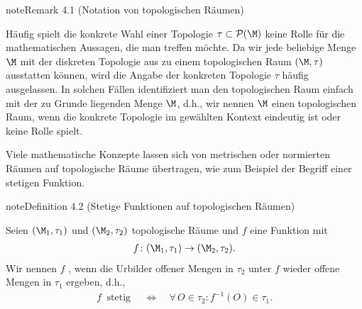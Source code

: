 \documentclass[letterpaper,10pt,english]{jupyterBook}
\begin{document}
\label{manifolds/manifolds_prelim:remark-2}
\begin{sphinxadmonition}{note}{Remark 4.1 (Notation von topologischen Räumen)}



\sphinxAtStartPar
Häufig spielt die konkrete Wahl einer Topologie \(\tau \subset \mathcal{P}(\M)\) keine Rolle für die mathematischen Aussagen, die man treffen möchte.
Da wir jede beliebige Menge \(\M\) mit der diskreten Topologie aus {\hyperref[\detokenize{manifolds/manifolds_prelim:ex:diskreteTopologie}]{}} zu einem topologischen Raum \((\M, \tau)\) ausstatten können, wird die Angabe der konkreten Topologie \(\tau\) häufig ausgelassen.
In solchen Fällen identifiziert man den topologischen Raum einfach mit der zu Grunde liegenden Menge \(\M\), d.h., wir nennen \(\M\) einen topologischen Raum, wenn die konkrete Topologie im gewählten Kontext eindeutig ist oder keine Rolle spielt.
\end{sphinxadmonition}

\sphinxAtStartPar
Viele mathematische Konzepte lassen sich von metrischen oder normierten Räumen auf topologische Räume übertragen, wie zum Beispiel der Begriff einer stetigen Funktion.
\label{manifolds/manifolds_prelim:def:stetigkeitTopologie}
\begin{sphinxadmonition}{note}{Definition 4.2 (Stetige Funktionen auf topologischen Räumen)}



\sphinxAtStartPar
Seien \((\M_1, \tau_1)\) und \((\M_2, \tau_2)\) topologische Räume und \(f\) eine Funktion mit
\begin{equation*}
\begin{split}f \colon (\M_1, \tau_1) \rightarrow (\M_2, \tau_2).\end{split}
\end{equation*}
\sphinxAtStartPar
Wir nennen \(f\) , wenn die Urbilder offener Mengen in \(\tau_2\) unter \(f\) wieder offene Mengen in \(\tau_1\) ergeben, d.h.,
\begin{equation*}
\begin{split}f \ \text{ stetig } \quad \Leftrightarrow \quad \forall \, O \in \tau_2 : f^{-1}(O) \in \tau_1.\end{split}
\end{equation*}\end{sphinxadmonition}
\end{document}
